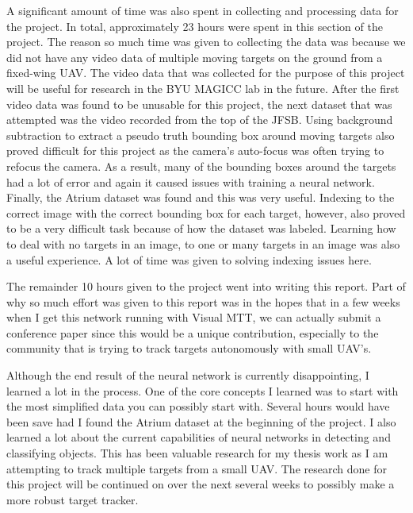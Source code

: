 \documentclass[letterpaper, 10 pt, conference]{ieeeconf}  %
\begin{document}
A significant amount of time was also spent in collecting and processing data for the project. In total, approximately 23 hours were spent in this section of the project. The reason so much time was given to collecting the data was because we did not have any video data of multiple moving targets on the ground from a fixed-wing UAV. The video data that was collected for the purpose of this project will be useful for research in the BYU MAGICC lab in the future. After the first video data was found to be unusable for this project, the next dataset that was attempted was the video recorded from the top of the JFSB. Using background subtraction to extract a pseudo truth bounding box around moving targets also proved difficult for this project as the camera's auto-focus was often trying to refocus the camera. As a result, many of the bounding boxes around the targets had a lot of error and again it caused issues with training a neural network. Finally, the Atrium dataset was found and this was very useful. Indexing to the correct image with the correct bounding box for each target, however, also proved to be a very difficult task because of how the dataset was labeled. Learning how to deal with no targets in an image, to one or many targets in an image was also a useful experience. A lot of time was given to solving indexing issues here.

The remainder 10 hours given to the project went into writing this report. Part of why so much effort was given to this report was in the hopes that in a few weeks when I get this network running with Visual MTT, we can actually submit a conference paper since this would be a unique contribution, especially to the community that is trying to track targets autonomously with small UAV's. 

Although the end result of the neural network is currently disappointing, I learned a lot in the process. One of the core concepts I learned was to start with the most simplified data you can possibly start with. Several hours would have been save had I found the Atrium dataset at the beginning of the project. I also learned a lot about the current capabilities of neural networks in detecting and classifying objects. This has been valuable research for my thesis work as I am attempting to track multiple targets from a small UAV. The research done for this project will be continued on over the next several weeks to possibly make a more robust target tracker. 









\end{document}
